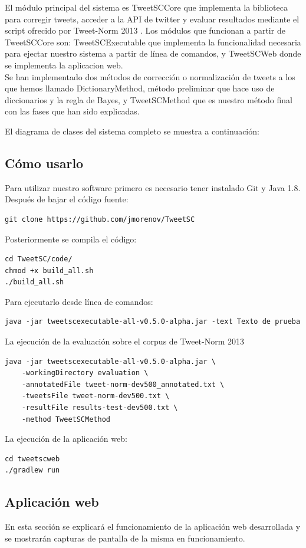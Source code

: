 \documentclass[spanish,12pt, a4paper,twoside]{paper}
\begin{document}
El módulo principal del sistema es TweetSCCore que implementa la biblioteca para corregir tweets, acceder a la API de twitter y evaluar resultados mediante el script ofrecido por Tweet-Norm 2013 \cite{alegria:2013}. Los módulos que funcionan a partir de TweetSCCore son: TweetSCExecutable que implementa la funcionalidad necesaria para ejectar nuestro sistema a partir de línea de comandos, y TweetSCWeb donde se implementa la aplicacion web.\\

Se han implementado dos métodos de corrección o normalización de tweets a los que hemos llamado DictionaryMethod, método preliminar que hace uso de diccionarios y la regla de Bayes, y TweetSCMethod que es nuestro método final con las fases que han sido explicadas.

El diagrama de clases del sistema completo se muestra a continuación:

\subsection{Cómo usarlo}\label{sec:comousarlo}
Para utilizar nuestro software primero es necesario tener instalado Git y Java 1.8. Después de bajar el código fuente: 
\begin{verbatim}
git clone https://github.com/jmorenov/TweetSC
\end{verbatim}
Posteriormente se compila el código: 
\begin{verbatim}
cd TweetSC/code/
chmod +x build_all.sh
./build_all.sh
\end{verbatim}
Para ejecutarlo desde línea de comandos:
\begin{verbatim}
java -jar tweetscexecutable-all-v0.5.0-alpha.jar -text Texto de prueba
\end{verbatim}
La ejecución de la evaluación sobre el corpus de Tweet-Norm 2013 \cite{alegria:2013}
\begin{verbatim}
java -jar tweetscexecutable-all-v0.5.0-alpha.jar \
    -workingDirectory evaluation \
    -annotatedFile tweet-norm-dev500_annotated.txt \
    -tweetsFile tweet-norm-dev500.txt \
    -resultFile results-test-dev500.txt \
    -method TweetSCMethod
\end{verbatim}
La ejecución de la aplicación web:
\begin{verbatim}
cd tweetscweb
./gradlew run
\end{verbatim}

\subsection{Aplicación web}\label{sec:aplicacionweb}
En esta sección se explicará el funcionamiento de la aplicación web desarrollada y se mostrarán capturas de pantalla de la misma en funcionamiento.\\
\end{document}

